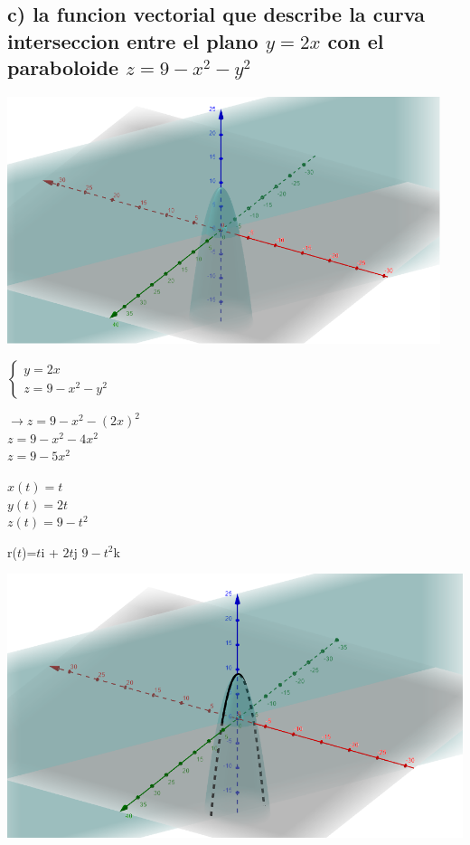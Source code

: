 \documentclass[12pt, letter-paper]{article}
\begin{document}
\begin{enumerate}
    \subsection*{c) la funcion vectorial que describe la curva interseccion entre el plano $y=2x$ con el paraboloide $z=9-x^2-y^2$}
    
    \includegraphics[width=0.95\textwidth]{Imag/27-c1.png} 
    \begin{center}
    $\left\{\begin{array}{c}{y=2x} \\ {z=9-x^2-y^2}\end{array}\right.$
    \end{center} 
    \begin{center}
    $\rightarrow z=9-x^2-(2x)^2$\\$z=9-x^2-4x^2$\\$z=9-5x^2$
    \end{center}
    \begin{center}
    $x(t)=t$\\$y(t)=2t$\\$z(t)=9-t^2$
    \end{center}
    \begin{center}
    r($t$)=$t$i + $2t$j $9-t^2$k
    \end{center}
    \includegraphics[width=.95\textwidth]{Imag/27-c.png}

    

\end{enumerate}
\end{document}
